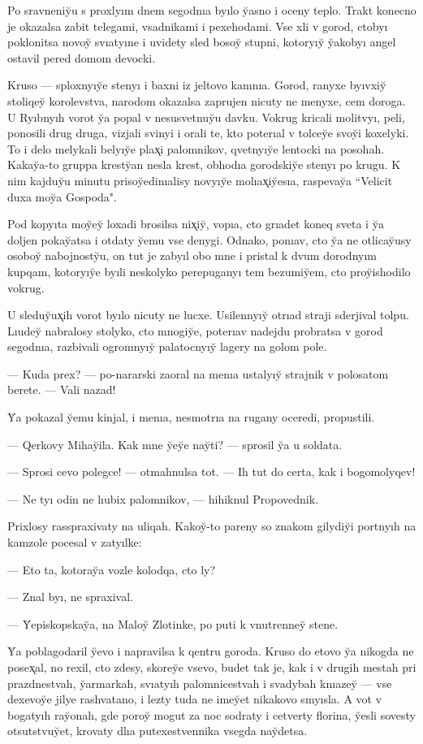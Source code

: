 \documentclass[10pt]{book}
\begin{document}
Po sravneniy̆u s proxlyım dnem segodnıa byılo y̆asno i oceny teplo. Trakt konecno je okazalsa zabit telegami, vsadnikami i pexehodami. Vse xli v gorod, ctobyı poklonitsa novoy̆ svıatyıne i uvidety sled bosoy̆ stupni, kotoryıy̆ y̆akobyı angel ostavil pered domom devocki.

Kruso — sploxnyıy̆e stenyı i baxni iz jeltovo kamnıa. Gorod, ranyxe byıvxiy̆ stoliqey̆ korolevstva, narodom okazalsa zaprujen nicuty ne menyxe, cem doroga. U Ryıbnyıh vorot y̆a popal v nesusvetnuy̆u davku. Vokrug kricali molitvyı, peli, ponosili drug druga, vizjali svinyi i orali te, kto poterıal v tolcey̆e svoy̆i koxelyki. To i delo melykali belyıy̆e plax̨i palomnikov, qvetnyıy̆e lentocki na posohah. Kakay̆a-to gruppa kresty̆an nesla krest, obhodıa gorodskiy̆e stenyı po krugu. K nim kajduy̆u minutu prisoy̆edinıalisy novyıy̆e molıax̨iy̆esıa, raspevay̆a ``Velicit duxa moy̆a Gospoda".

Pod kopyıta moy̆ey̆ loxadi brosilsa nix̨iy̆, vopıa, cto grıadet koneq sveta i y̆a doljen pokay̆atsa i otdaty y̆emu vse denygi. Odnako, ponıav, cto y̆a ne otlicay̆usy osoboy̆ nabojnosty̆u, on tut je zabyıl obo mne i pristal k dvum dorodnyım kupqam, kotoryıy̆e byıli neskolyko perepuganyı tem bezumiy̆em, cto proy̆ishodilo vokrug.

U sleduy̆ux̨ih vorot byılo nicuty ne lucxe. Usilennyıy̆ otrıad straji sderjival tolpu. Lıudey̆ nabralosy stolyko, cto mnogiy̆e, poterıav nadejdu probratsa v gorod segodnıa, razbivali ogromnyıy̆ palatocnyıy̆ lagery na golom pole.

— Kuda prex? — po-nararski zaoral na menıa ustalyıy̆ strajnik v polosatom berete. — Vali nazad!

Y̆a pokazal y̆emu kinjal, i menıa, nesmotrıa na rugany oceredi, propustili.

— Qerkovy Mihay̆ila. Kak mne y̆ey̆e nay̆ti? — sprosil y̆a u soldata.

— Sprosi cevo polegce! — otmahnulsa tot. — Ih tut do certa, kak i bogomolyqev!

— Ne tyı odin ne lıubix palomnikov, — hihiknul Propovednik.

Prixlosy rasspraxivaty na uliqah. Kakoy̆-to pareny so znakom gilydiy̆i portnyıh na kamzole pocesal v zatyılke:

— Eto ta, kotoray̆a vozle kolodqa, cto ly?

— Znal byı, ne spraxival.

— Y̆episkopskay̆a, na Maloy̆ Zlotinke, po puti k vnutrenney̆ stene.

Y̆a poblagodaril y̆evo i napravilsa k qentru goroda. Kruso do etovo y̆a nikogda ne posex̨al, no rexil, cto zdesy, skorey̆e vsevo, budet tak je, kak i v drugih mestah pri prazdnestvah, y̆armarkah, svıatyıh palomnicestvah i svadybah knıazey̆ — vse dexevoy̆e jilye rashvatano, i lezty tuda ne imey̆et nikakovo smyısla. A vot v bogatyıh ray̆onah, gde poroy̆ mogut za noc sodraty i cetverty florina, y̆esli sovesty otsutstvuy̆et, krovaty dlıa putexestvennika vsegda nay̆detsa.
\end{document}
